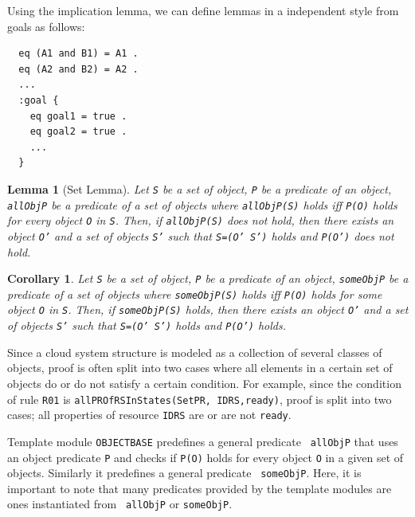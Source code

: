 \documentclass[12pt]{report}
\newtheorem{lemma}{Lemma}
\newtheorem{corollary}{Corollary}
\newcommand{\stt}[1]{{\small{\tt {#1}}}}
\begin{document}
Using the implication lemma, we can define lemmas in a independent
style from goals as follows:
\begin{verbatim}
  eq (A1 and B1) = A1 .
  eq (A2 and B2) = A2 .
  ...
  :goal {
    eq goal1 = true .
    eq goal2 = true .
    ...
  }
\end{verbatim}

\begin{lemma}[Set Lemma]
Let {\tt S} be a set of object, {\tt P} be a predicate of an object,
{\tt allObjP} be a predicate of a set of objects where
\stt{allObjP(S)} holds iff \stt{P(O)} holds for every object {\tt O}
in {\tt S}. Then, if \stt{allObjP(S)} does not hold, then there exists
an object {\tt O'} and a set of objects {\tt S'} such that \stt{S=(O'
  S')} holds and \stt{P(O')} does not hold.
\end{lemma}
\begin{corollary}
Let {\tt S} be a set of object, {\tt P} be a predicate of an object,
{\tt someObjP} be a predicate of a set of objects where
\stt{someObjP(S)} holds iff \stt{P(O)} holds for some object {\tt O}
in {\tt S}. Then, if \stt{someObjP(S)} holds, then there exists an
object {\tt O'} and a set of objects {\tt S'} such that \stt{S=(O'
  S')} holds and \stt{P(O')} holds.
\end{corollary}
Since a cloud system structure is modeled as a collection of several
classes of objects, proof is often split into two cases where all
elements in a certain set of objects do or do not satisfy a certain
condition.  For example, since the condition of rule {\tt R01} is 
\stt{allPROfRSInStates(SetPR, IDRS,ready)}, proof is split into two
cases; all properties of resource {\tt IDRS} are or are not
{\tt ready}.

Template module {\tt OBJECTBASE} predefines a general predicate {\tt
  allObjP} that uses an object predicate {\tt P} and checks if
\stt{P(O)} holds for every object {\tt O} in a given set of
objects. Similarly it predefines a general predicate {\tt
  someObjP}. Here, it is important to note that many predicates
provided by the template modules are ones instantiated from {\tt
  allObjP} or {\tt someObjP}.
\end{document}
